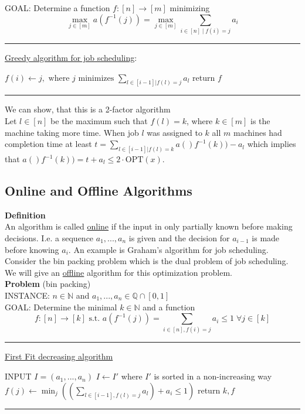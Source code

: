 \documentclass[a4paper, 12pt]{article}
\begin{document}
	\noindent GOAL: Determine a function $f: [n] \to [m]$ minimizing \[\max_{j \in [m]} a(f^{-1}(j)) = \max_{j \in [m]} \sum_{i \in [n] \; | \; f(i) = j} a_i\]
	
	\par\noindent\rule{\textwidth}{0.4pt}
	\noindent\underline{Greedy algorithm for job scheduling}:
	\begin{algorithmic}
			\State $f(i) \gets j, \text{ where $j$ minimizes } \sum_{l \in [i-1] | f(l) = j} a_l$
		\EndFor
		\State return $f$
	\end{algorithmic}
\par\noindent\rule{\textwidth}{0.4pt}
	We can show, that this is a 2-factor algorithm\\
	Let $l \in [n]$ be the maximum such that $f(l) = k$, where $k \in [m]$ is the machine taking more time. When job $l$ was assigned to $k$ all $m$ machines had completion time at least $t = \sum_{l \in [i-1] | f(l) = k} a()f^{-1}(k))-a_l$ which implies that $a()f^{-1}(k)) = t+a_l \leq 2\cdot\text{OPT}(x)$.
	
	\subsection{Online and Offline Algorithms}
	\textbf{Definition}\\
	An algorithm is called \underline{online} if the input in only partially known before making decisions. I.e. a sequence $a_1,...,a_n$ is given and the decision for $a_{i-1}$ is made before knowing $a_i$. An example is Graham's algorithm for job scheduling.\\
	
	Consider the bin packing problem which is the dual problem of job scheduling. We will give an \underline{offline} algorithm for this optimization problem.\\
	\textbf{Problem} (bin packing)\\
	INSTANCE: $n \in \mathbb{N}$ and $a_1,...,a_n \in \mathbb{Q} \cap [0,1]$\\
	GOAL: Determine the minimal $k \in \mathbb{N}$ and a function \[f: [n] \to [k] \text{ s.t. } a(f^{-1}(j)) = \sum_{i \in [n], f(i) = j} a_i \leq 1 \; \forall j \in [k]\]
	\par\noindent\rule{\textwidth}{0.4pt}
	\underline{First Fit decreasing algorithm}
	\begin{algorithmic}
		\State INPUT $I = (a_1,...,a_n)$
		\State $I \gets I'$ where $I'$ is sorted in a non-increasing way
		\For{$i=1$ to $n$}
			\State $f(j) \gets \min_j ((\sum_{l \in [i-1], f(l) = j} a_l) + a_i \leq 1)$
		\EndFor
		\State return $k,f$
	\end{algorithmic}
	\par\noindent\rule{\textwidth}{0.4pt}
	
\end{document}

